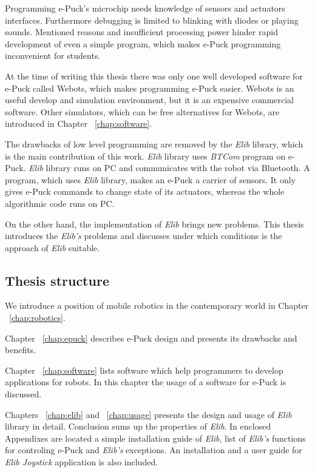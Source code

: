 \documentclass[12pt,notitlepage]{report}
\begin{document}
	Programming e-Puck's microchip needs knowledge of sensors and actuators interfaces.
	Furthermore debugging is limited to blinking with diodes or playing sounds.
	Mentioned reasons and insufficient processing power hinder rapid development of even a simple program, 
	which makes e-Puck programming inconvenient for students.
	
	At the time of writing this thesis there was only one well developed software for e-Puck called Webots,
	which makes programming e-Puck easier.
	Webots is an useful develop and simulation environment, but it is an expensive commercial software.
	Other simulators, which can be free alternatives for Webots, are introduced in Chapter ~\ref{chap:software}.
	
	The drawbacks of low level programming are removed by the {\it Elib} library, which is the main 
	contribution of this work.
        {\it Elib} library uses {\it BTCom} program on e-Puck.
	{\it Elib} library runs on PC and communicates with the robot via Bluetooth. 
	A program, which uses {\it Elib} library,	makes an e-Puck a carrier of sensors. It only gives e-Puck 	
	commands to change state of its actuators, whereas the whole algorithmic code runs on PC.
	
	On the other hand, the implementation of {\it Elib} brings new problems.
	This thesis introduces the {\it Elib's} problems and discusses 
	under which conditions is the approach of {\it Elib} suitable.	
	\subsection*{Thesis structure}
	We introduce a position of mobile robotics in the contemporary world in Chapter ~\ref{chap:robotics}.

	Chapter ~\ref{chap:epuck} describes e-Puck design and presents its drawbacks and benefits.

	Chapter ~\ref{chap:software} lists software which help programmers to develop applications for robots.
	In this chapter the usage of a software for e-Puck is discussed. 
	
	Chapters ~\ref{chap:elib} and ~\ref{chap:usage} presents the design and usage of {\it Elib} library in detail.
	Conclusion sums up the properties of {\it Elib}.
	In enclosed Appendixes are located a simple installation guide of {\it Elib}, list of {\it Elib's} functions 
	for controling e-Puck and {\it Elib's} exceptions. 
	An installation and a user guide for {\it Elib Joystick} application is also included. 
\end{document}
